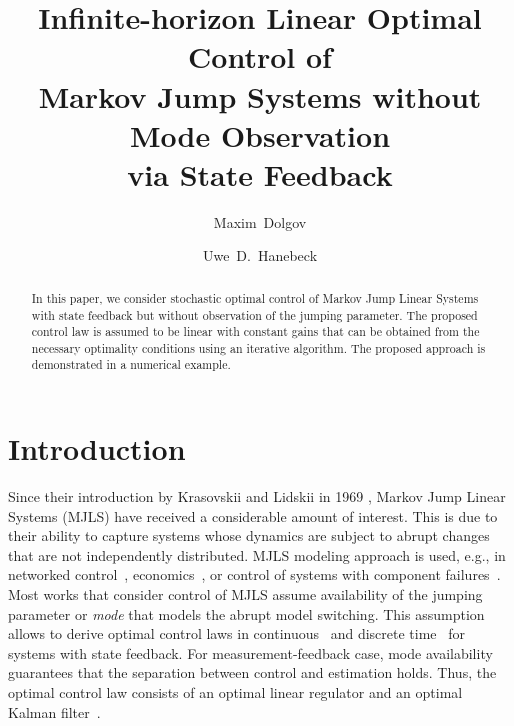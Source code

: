 \documentclass[preprint,1p,11pt]{IR-Template/ISAS_IR}
\begin{document}
    \begin{frontmatter}
        \title{Infinite-horizon Linear Optimal Control of\\Markov Jump Systems without Mode Observation\\via State Feedback}
        
        \author{Maxim~Dolgov}
        
        \author{Uwe~D.~Hanebeck}
        
        \address{Intelligent Sensor-Actuator-Systems Laboratory (ISAS)\\
                 Institute for Anthropomatics and Robotics\\
                 Karlsruhe Institute of Technology (KIT), Germany\vspace{3mm}}
        
        \begin{abstract}
        In this paper, we consider stochastic optimal control of Markov Jump Linear Systems with state feedback but without observation of the jumping parameter. The proposed control law is assumed to be linear with constant gains that can be obtained from the necessary optimality conditions using an iterative algorithm. The proposed approach is demonstrated in a numerical example.
        \end{abstract}
    \end{frontmatter}
    
   \section{Introduction}
   	\label{sec:Introduction}
   	Since their introduction by Krasovskii and Lidskii in 1969 \cite{Krasovskii_1961_1,Krasovskii_1961_2,Krasovskii_1961_3}, Markov Jump Linear Systems (MJLS) have received a considerable amount of interest. This is due to their ability to capture systems whose dynamics are subject to abrupt changes that are not independently distributed. MJLS modeling approach is used, e.g., in networked control~\cite{Hespanha_2007,ACC13_Fischer}, economics~\cite{doVal_1999,Elliott_2007}, or control of systems with component failures~\cite{Vargas_2013}.\\

Most works that consider control of MJLS assume availability of the jumping parameter or \emph{mode} that models the abrupt model switching. This assumption allows to derive optimal control laws in continuous~\cite{Sworder_1969} and discrete time~\cite{Chizeck_1986,Fragoso_1989} for systems with state feedback. For measurement-feedback case, mode availability guarantees that the separation between control and estimation holds. Thus, the optimal control law consists of an optimal linear regulator and an optimal Kalman filter~\cite{Chizeck_1988}.\\
\end{document}
